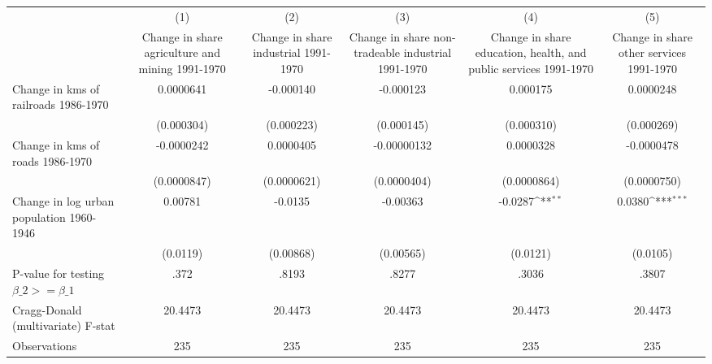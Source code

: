 {
\def\sym#1{\ifmmode^{#1}\else\(^{#1}\)\fi}
\begin{tabular}{l*{5}{c}}
\hline\hline
                &\multicolumn{1}{c}{(1)}&\multicolumn{1}{c}{(2)}&\multicolumn{1}{c}{(3)}&\multicolumn{1}{c}{(4)}&\multicolumn{1}{c}{(5)}\\
                &\multicolumn{1}{c}{Change in share agriculture and mining 1991-1970}&\multicolumn{1}{c}{Change in share industrial 1991-1970}&\multicolumn{1}{c}{Change in share non-tradeable industrial 1991-1970}&\multicolumn{1}{c}{Change in share education, health, and public services 1991-1970}&\multicolumn{1}{c}{Change in share other services 1991-1970}\\
\hline
Change in kms of railroads 1986-1970&0.0000641         &-0.000140         &-0.000123         & 0.000175         &0.0000248         \\
                &(0.000304)         &(0.000223)         &(0.000145)         &(0.000310)         &(0.000269)         \\
[1em]
Change in kms of roads 1986-1970&-0.0000242         &0.0000405         &-0.00000132         &0.0000328         &-0.0000478         \\
                &(0.0000847)         &(0.0000621)         &(0.0000404)         &(0.0000864)         &(0.0000750)         \\
[1em]
Change in log urban population 1960-1946&  0.00781         &  -0.0135         & -0.00363         &  -0.0287\sym{**} &   0.0380\sym{***}\\
                & (0.0119)         &(0.00868)         &(0.00565)         & (0.0121)         & (0.0105)         \\
\hline
P-value for testing $\beta\_{2} >= \beta\_{1}$&     .372         &    .8193         &    .8277         &    .3036         &    .3807         \\
Cragg-Donald (multivariate) F-stat&  20.4473         &  20.4473         &  20.4473         &  20.4473         &  20.4473         \\
Observations    &      235         &      235         &      235         &      235         &      235         \\
\hline\hline
\end{tabular}
}
